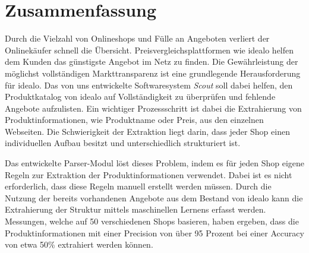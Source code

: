 \section*{Zusammenfassung}
\label{sec:abstract}

Durch die Vielzahl von Onlineshops und Fülle an Angeboten verliert der Onlinekäufer schnell die Übersicht.
Preisvergleichsplattformen wie idealo helfen dem Kunden das günstigste Angebot im Netz zu finden.
Die Gewährleistung der möglichst vollständigen Markttransparenz ist eine grundlegende Herausforderung für idealo.
Das von uns entwickelte Softwaresystem \textit{Scout} soll dabei helfen, den Produktkatalog von idealo auf
Vollständigkeit zu überprüfen und fehlende Angebote aufzulisten.
Ein wichtiger Prozessschritt ist dabei die Extrahierung von Produktinformationen, wie Produktname oder Preis, aus den
einzelnen Webseiten.
Die Schwierigkeit der Extraktion liegt darin, dass jeder Shop einen individuellen Aufbau besitzt und unterschiedlich
strukturiert ist.

Das entwickelte Parser-Modul löst dieses Problem, indem es für jeden Shop eigene Regeln zur Extraktion der
Produktinformationen verwendet.
Dabei ist es nicht erforderlich, dass diese Regeln manuell erstellt werden müssen.
Durch die Nutzung der bereits vorhandenen Angebote aus dem Bestand von idealo kann die Extrahierung der Struktur
mittels maschinellen Lernens erfasst werden.
Messungen, welche auf 50 verschiedenen Shops basieren, haben ergeben, dass die Produktinformationen mit einer
Precision von über 95 Prozent bei einer Accuracy von etwa 50\% extrahiert werden können.